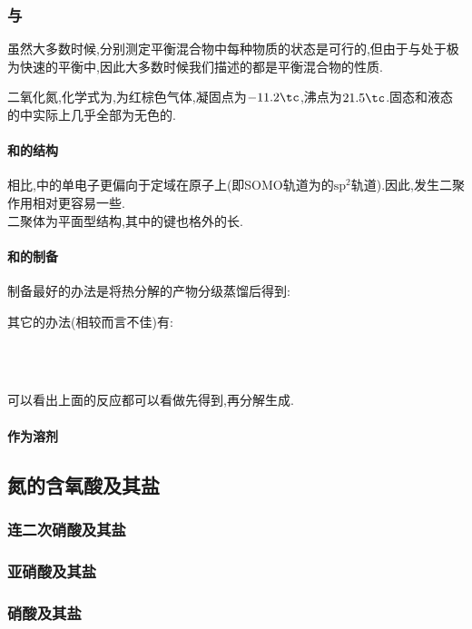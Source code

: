 \documentclass{ctexart}
\begin{document}
\subsubsection{与}
虽然大多数时候,分别测定平衡混合物中每种物质的状态是可行的,但由于与处于极为快速的平衡中,因此大多数时候我们描述的都是平衡混合物的性质.
\begin{substance}[\ce{NO2}]
    二氧化氮,化学式为,为红棕色气体,凝固点为$-11.2\tc$,沸点为$21.5\tc$.固态和液态的中实际上几乎全部为无色的.
\end{substance}
\paragraph{和的结构}
相比,中的单电子更偏向于定域在原子上(即SOMO轨道为的$\text{sp}^2$轨道).因此,发生二聚作用相对更容易一些.\\
\indent 二聚体为平面型结构,其中的键也格外的长.
\paragraph{和的制备}
制备最好的办法是将热分解的产物分级蒸馏后得到:
\begin{center}
\end{center}
其它的办法(相较而言不佳)有:
\begin{center}
    \\
    \\
\end{center}
可以看出上面的反应都可以看做先得到,再分解生成.
\paragraph{作为溶剂}

\subsubsection{}
\subsection{氮的含氧酸及其盐}
\subsubsection{连二次硝酸及其盐}
\subsubsection{亚硝酸及其盐}
\subsubsection{硝酸及其盐}
\end{document}
